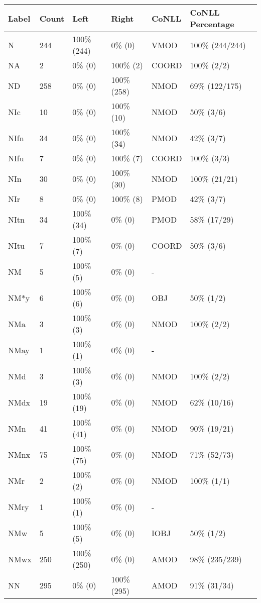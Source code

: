 \begin{figure*}
\begin{tabular}{|l|l|l|l||l|l|}
\hline
Label & Count & Left & Right & CoNLL & CoNLL Percentage\\ 
\hline
 N & 244 & 100\% (244) & 0\% (0) & VMOD & 100\% (244/244) \\ 
\hline
 NA & 2 & 0\% (0) & 100\% (2) & COORD & 100\% (2/2) \\ 
\hline
 ND & 258 & 0\% (0) & 100\% (258) & NMOD & 69\% (122/175) \\ 
\hline
 NIc & 10 & 0\% (0) & 100\% (10) & NMOD & 50\% (3/6) \\ 
\hline
 NIfn & 34 & 0\% (0) & 100\% (34) & NMOD & 42\% (3/7) \\ 
\hline
 NIfu & 7 & 0\% (0) & 100\% (7) & COORD & 100\% (3/3) \\ 
\hline
 NIn & 30 & 0\% (0) & 100\% (30) & NMOD & 100\% (21/21) \\ 
\hline
 NIr & 8 & 0\% (0) & 100\% (8) & PMOD & 42\% (3/7) \\ 
\hline
 NItn & 34 & 100\% (34) & 0\% (0) & PMOD & 58\% (17/29) \\ 
\hline
 NItu & 7 & 100\% (7) & 0\% (0) & COORD & 50\% (3/6) \\ 
\hline
 NM & 5 & 100\% (5) & 0\% (0) & - &  \\ 
\hline
 NM*y & 6 & 100\% (6) & 0\% (0) & OBJ & 50\% (1/2) \\ 
\hline
 NMa & 3 & 100\% (3) & 0\% (0) & NMOD & 100\% (2/2) \\ 
\hline
 NMay & 1 & 100\% (1) & 0\% (0) & - &  \\ 
\hline
 NMd & 3 & 100\% (3) & 0\% (0) & NMOD & 100\% (2/2) \\ 
\hline
 NMdx & 19 & 100\% (19) & 0\% (0) & NMOD & 62\% (10/16) \\ 
\hline
 NMn & 41 & 100\% (41) & 0\% (0) & NMOD & 90\% (19/21) \\ 
\hline
 NMnx & 75 & 100\% (75) & 0\% (0) & NMOD & 71\% (52/73) \\ 
\hline
 NMr & 2 & 100\% (2) & 0\% (0) & NMOD & 100\% (1/1) \\ 
\hline
 NMry & 1 & 100\% (1) & 0\% (0) & - &  \\ 
\hline
 NMw & 5 & 100\% (5) & 0\% (0) & IOBJ & 50\% (1/2) \\ 
\hline
 NMwx & 250 & 100\% (250) & 0\% (0) & AMOD & 98\% (235/239) \\ 
\hline
 NN & 295 & 0\% (0) & 100\% (295) & AMOD & 91\% (31/34) \\ 

\end{tabular}
\end{figure*}
